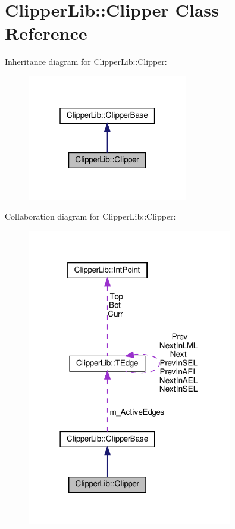 \hypertarget{class_clipper_lib_1_1_clipper}{}\section{Clipper\+Lib\+:\+:Clipper Class Reference}
\label{class_clipper_lib_1_1_clipper}


Inheritance diagram for Clipper\+Lib\+:\+:Clipper\+:
\nopagebreak
\begin{figure}[H]
\begin{center}
\leavevmode
\includegraphics[width=199pt]{class_clipper_lib_1_1_clipper__inherit__graph}
\end{center}
\end{figure}


Collaboration diagram for Clipper\+Lib\+:\+:Clipper\+:
\nopagebreak
\begin{figure}[H]
\begin{center}
\leavevmode
\includegraphics[width=254pt]{class_clipper_lib_1_1_clipper__coll__graph}
\end{center}
\end{figure}
